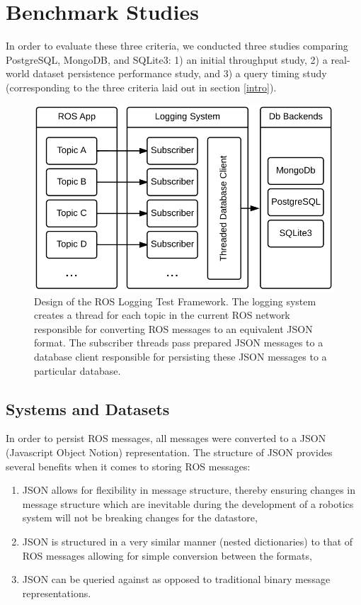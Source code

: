 \documentclass[nocopyrightspace]{acm_proc_article-sp}
\begin{document}
\section{Benchmark Studies}
In order to evaluate these three criteria, we conducted three studies comparing PostgreSQL, MongoDB, and SQLite3: 1) an initial throughput study, 2) a real-world dataset persistence performance study, and 3) a query timing study (corresponding to the three criteria laid out in section \ref{intro}).

\begin{figure}
    \centering
    \includegraphics[width=\linewidth]{images/roslog}
    \caption{Design of the ROS Logging Test Framework. The logging system creates a thread for each topic in the current ROS network responsible for converting ROS messages to an equivalent JSON format. The subscriber threads pass prepared JSON messages to a database client responsible for persisting these JSON messages to a particular database.}
    \label{fig:roslog}
\end{figure}

\subsection{Systems and Datasets}
\label{sec:datasets}
In order to persist ROS messages, all messages were converted to a JSON (Javascript Object Notion) representation. The structure of JSON provides several benefits when it comes to storing ROS messages:
\begin{enumerate}
\item JSON allows for flexibility in message structure, thereby ensuring changes in message structure which are inevitable during the development of a robotics system will not be breaking changes for the datastore,
\item JSON is structured in a very similar manner (nested dictionaries) to that of ROS messages allowing for simple conversion between the formats,
\item JSON can be queried against as opposed to traditional binary message representations.
\end{enumerate}
\end{document}
